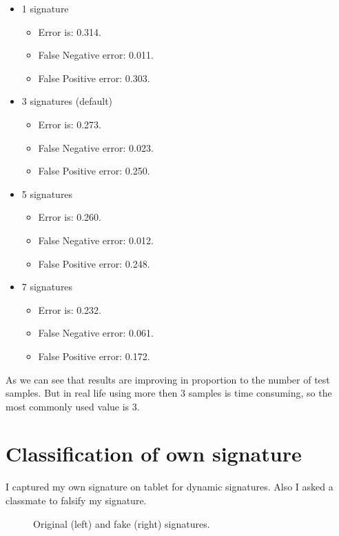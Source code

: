 \documentclass{article}
\begin{document}
\begin{itemize}
  \item 1 signature
  \begin{itemize}
    \item Error is: 0.314.
    \item False Negative error: 0.011.
    \item False Positive error: 0.303.
  \end{itemize}
  \item 3 signatures (default)
  \begin{itemize}
    \item Error is: 0.273.
    \item False Negative error: 0.023.
    \item False Positive error: 0.250.
  \end{itemize}
  \item 5 signatures
  \begin{itemize}
    \item Error is: 0.260.
    \item False Negative error: 0.012.
    \item False Positive error: 0.248.
  \end{itemize}
  \item 7 signatures
  \begin{itemize}
    \item Error is: 0.232.
    \item False Negative error: 0.061.
    \item False Positive error: 0.172.
  \end{itemize}
\end{itemize}

As we can see that results are improving in proportion to the number of test samples. 
But in real life using more then 3 samples is time consuming, so the most commonly used value is 3.

\section{Classification of own signature}

I captured my own signature on tablet for dynamic signatures.
Also I asked a classmate to falsify my signature.

\begin{figure}[htbp] 
  \centering
  \def\svgscale{0.69}
  
  \caption{Original (left) and fake (right) signatures.}
  \label{own_fake_original}
\end{figure}
\end{document}
